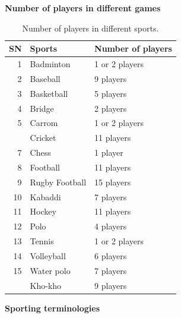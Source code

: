 \documentclass[
  openany]{book}
\begin{document}
\textbf{Number of players in different games}

\begin{table}

\caption{\label{tab:sport-num-players}Number of players in different sports.}
\centering
\begin{tabular}[t]{rll}
\toprule
SN & Sports & Number of players\\
\midrule
\rowcolor{gray!6}  1 & Badminton & 1 or 2 players\\
2 & Baseball & 9 players\\
\rowcolor{gray!6}  3 & Basketball & 5 players\\
4 & Bridge & 2 players\\
\rowcolor{gray!6}  5 & Carrom & 1 or 2 players\\
\addlinespace
6 & Cricket & 11 players\\
\rowcolor{gray!6}  7 & Chess & 1 player\\
8 & Football & 11 players\\
\rowcolor{gray!6}  9 & Rugby Football & 15 players\\
10 & Kabaddi & 7 players\\
\addlinespace
\rowcolor{gray!6}  11 & Hockey & 11 players\\
12 & Polo & 4 players\\
\rowcolor{gray!6}  13 & Tennis & 1 or 2 players\\
14 & Volleyball & 6 players\\
\rowcolor{gray!6}  15 & Water polo & 7 players\\
\addlinespace
16 & Kho-kho & 9 players\\
\bottomrule
\end{tabular}
\end{table}

\textbf{Sporting terminologies}
\end{document}
